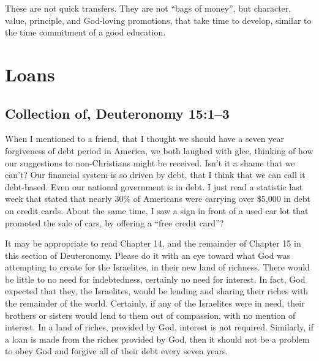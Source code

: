 \documentclass[12pt]{memoir}
\begin{document}
These are not quick transfers. They are not ``bags of money'', but
character, value, principle, and God-loving promotions, that take
time to develop, similar to the time commitment of a good education. 

\section{Loans}

\subsection{Collection of, Deuteronomy 15:1--3}

When I mentioned to a friend, that I thought we should have a seven
year forgiveness of debt period in America, we both laughed with glee,
thinking of how our suggestions to non-Christians might be received.
Isn't it a shame that we can't? Our financial system is so driven
by debt, that I think that we can call it debt-based. Even our national
government is in debt. I just read a statistic last week that stated
that nearly 30\% of Americans were carrying over \$5,000 in debt on
credit cards. About the same time, I saw a sign in front of a used
car lot that promoted the sale of cars, by offering a ``free credit
card''?

It may be appropriate to read Chapter 14, and the remainder of Chapter
15 in this section of Deuteronomy. Please do it with an eye toward
what God was attempting to create for the Israelites, in their new
land of richness. There would be little to no need for indebtedness,
certainly no need for interest. In fact, God expected that they, the
Israelites, would be lending and sharing their riches with the remainder
of the world. Certainly, if any of the Israelites were in need, their
brothers or sisters would lend to them out of compassion, with no
mention of interest. In a land of riches, provided by God, interest
is not required. Similarly, if a loan is made from the riches provided
by God, then it should not be a problem to obey God and forgive all
of their debt every seven years.
\end{document}
